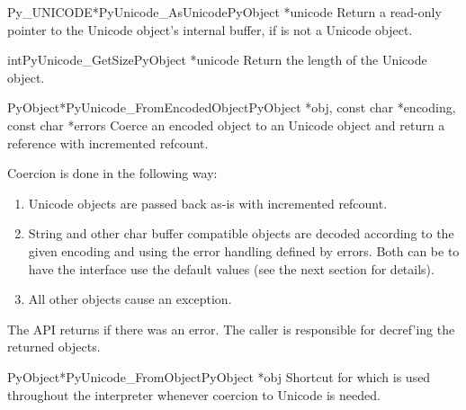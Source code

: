 \begin{cfuncdesc}{Py_UNICODE*}{PyUnicode_AsUnicode}{PyObject *unicode}
  Return a read-only pointer to the Unicode object's internal
   buffer, \NULL{} if  is not a Unicode
  object.
\end{cfuncdesc}

\begin{cfuncdesc}{int}{PyUnicode_GetSize}{PyObject *unicode}
  Return the length of the Unicode object.
\end{cfuncdesc}

\begin{cfuncdesc}{PyObject*}{PyUnicode_FromEncodedObject}{PyObject *obj,
                                                      const char *encoding,
                                                      const char *errors}
  Coerce an encoded object  to an Unicode object and return a
  reference with incremented refcount.

  Coercion is done in the following way:

\begin{enumerate}
\item  Unicode objects are passed back as-is with incremented
       refcount. 

\item String and other char buffer compatible objects are decoded
      according to the given encoding and using the error handling
      defined by errors.  Both can be \NULL{} to have the interface
      use the default values (see the next section for details).

\item All other objects cause an exception.
\end{enumerate}

  The API returns \NULL{} if there was an error.  The caller is
  responsible for decref'ing the returned objects.
\end{cfuncdesc}

\begin{cfuncdesc}{PyObject*}{PyUnicode_FromObject}{PyObject *obj}
  Shortcut for 
  which is used throughout the interpreter whenever coercion to
  Unicode is needed.
\end{cfuncdesc}


